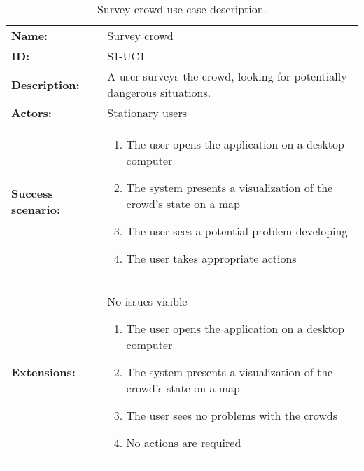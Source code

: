 \begin{table}[h!]
    \centering
    \begin{tabularx}{\textwidth}{l X}
        \toprule
        \textbf{Name:}  & Survey crowd \\
        \textbf{ID:}    & S1-UC1 \\
        \textbf{Description:} & A user surveys the crowd, looking for potentially dangerous situations. \\
        \textbf{Actors:} & Stationary users \\
        \textbf{Success scenario:} & 
        \begin{enumerate}
            \item The user opens the application on a desktop computer
            \item The system presents a visualization of the crowd's state on a map
            \item The user sees a potential problem developing
            \item The user takes appropriate actions
        \end{enumerate}
        \\
        \textbf{Extensions:} & No issues visible
        \begin{enumerate}
            \item The user opens the application on a desktop computer
            \item The system presents a visualization of the crowd's state on a map
            \item The user sees no problems with the crowds
            \item No actions are required
        \end{enumerate} 
        \\ \bottomrule
    \end{tabularx}
    \caption{Survey crowd use case description.}
    \label{tab:s1-uc1}
\end{table}